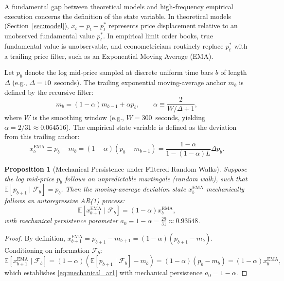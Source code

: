 \documentclass[12pt]{article}
\newtheorem{proposition}[theorem]{Proposition}
\theoremstyle{definition}
\theoremstyle{remark}
\begin{document}
A fundamental gap between theoretical models and high-frequency empirical execution concerns the definition of the state variable. In theoretical models (Section~\ref{sec:model}), $x_t \equiv p_t - p_t^*$ represents price displacement relative to an unobserved fundamental value $p_t^*$. In empirical limit order books, true fundamental value is unobservable, and econometricians routinely replace $p_t^*$ with a trailing price filter, such as an Exponential Moving Average (EMA).

Let $p_b$ denote the log mid-price sampled at discrete uniform time bars $b$ of length $\Delta$ (e.g., $\Delta = 10$~seconds). The trailing exponential moving-average anchor $m_b$ is defined by the recursive filter:
\begin{equation}
m_b = (1 - \alpha) m_{b-1} + \alpha p_b, \qquad \alpha \equiv \frac{2}{W/\Delta + 1},
\label{eq:ema_def}
\end{equation}
where $W$ is the smoothing window (e.g., $W = 300$~seconds, yielding $\alpha = 2/31 \approx 0.064516$). The empirical state variable is defined as the deviation from this trailing anchor:
\begin{equation}
x_b^{\text{EMA}} \equiv p_b - m_b = (1 - \alpha)(p_b - m_{b-1}) = \frac{1 - \alpha}{1 - (1 - \alpha) L} \Delta p_b.
\label{eq:x_ema_rep}
\end{equation}

\begin{proposition}[Mechanical Persistence under Filtered Random Walks]
\label{prop:mechanical_persistence}
Suppose the log mid-price $p_b$ follows an unpredictable martingale (random walk), such that $\mathbb{E}[p_{b+1} \mid \mathcal{F}_b] = p_b$. Then the moving-average deviation state $x_b^{\text{EMA}}$ mechanically follows an autoregressive AR(1) process:
\begin{equation}
\mathbb{E}[x_{b+1}^{\text{EMA}} \mid \mathcal{F}_b] = (1 - \alpha) x_b^{\text{EMA}},
\label{eq:mechanical_ar1}
\end{equation}
with mechanical persistence parameter $a_0 \equiv 1 - \alpha = \frac{29}{31} \approx 0.93548$.
\end{proposition}

\begin{proof}
By definition, $x_{b+1}^{\text{EMA}} = p_{b+1} - m_{b+1} = (1 - \alpha)(p_{b+1} - m_b)$. Conditioning on information $\mathcal{F}_b$:
\begin{equation}
\mathbb{E}[x_{b+1}^{\text{EMA}} \mid \mathcal{F}_b] = (1 - \alpha) \left( \mathbb{E}[p_{b+1} \mid \mathcal{F}_b] - m_b \right) = (1 - \alpha)(p_b - m_b) = (1 - \alpha) x_b^{\text{EMA}},
\end{equation}
which establishes \eqref{eq:mechanical_ar1} with mechanical persistence $a_0 = 1 - \alpha$.
\end{proof}
\end{document}
